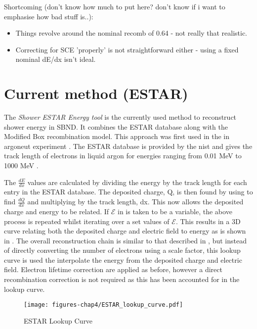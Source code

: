 Shortcoming (don't know how much to put here? don't know if i want to emphasise how bad stuff is..): 
\begin{itemize}
    \item Things revolve around the nominal recomb of 0.64 - not really that realistic. 
    \item Correcting for SCE 'properly' is not straightforward either - using a fixed nominal dE/dx isn't ideal.
\end{itemize}

\section{Current method (ESTAR)}
The \textit{Shower ESTAR Energy tool} is the currently used method to reconstruct shower energy in SBND. It combines the ESTAR database along with the Modified Box recombination model. This approach was first used in the in \Gls{argoneut} experiment \cite{ArgoNeuT_ESTAR_paper}. The ESTAR database is provided by the \Gls{nist} and gives the track length of electrons in liquid argon for energies ranging from 0.01 MeV to 1000 MeV \cite{ESTAR_Database}.

The $\frac{dE}{dx}$ values are calculated by dividing the energy by the track length for each entry in the ESTAR database. The deposited charge, Q, is then found by using  to find $\frac{dQ}{dx}$ and multiplying by the track length, dx. This now allows the deposited charge and energy to be related. If $\mathcal{E}$ in  is taken to be a variable, the above process is repeated whilst iterating over a set values of $\mathcal{E}$. This results in a 3D curve relating both the deposited charge and electric field to energy as is shown in . The overall reconstruction chain is similar to that described in , but instead of directly converting the number of electrons using a scale factor, this lookup curve is used the interpolate the energy from the deposited charge and electric field. Electron lifetime correction are applied as before, however a direct recombination correction is not required as this has been accounted for in the lookup curve. 

\begin{figure}[h]
    \centering
    \texttt{[image: figures-chap4/ESTAR\_lookup\_curve.pdf]}
    \caption{ESTAR Lookup Curve}
    \label{fig:ESTAR lookup curve}
\end{figure}


